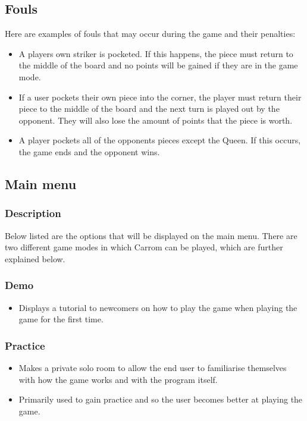 \documentclass[11pt,a4paper]{report}
\begin{document}
\subsection{Fouls}
Here are examples of fouls that may occur during the game and their penalties:
\begin{itemize}
  \item A players own striker is pocketed. If this happens, the piece must return to the middle of the board and no points will be gained if they are in the game mode.
  \item If a user pockets their own piece into the corner, the player must return their piece to the middle of the board and the next turn is played out by the opponent. They will also lose the amount of points that the piece is worth.
  \item A player pockets all of the opponents pieces except the Queen. If this occurs, the game ends and the opponent wins.
\end{itemize}

\subsection{Main menu}
\subsubsection{Description}
\noindent Below listed are the options that will be displayed on the main menu. There are two different game modes in which Carrom can be played, which are further explained below.

\subsubsection{Demo}
\begin{itemize}
    \item Displays a tutorial to newcomers on how to play the game when playing the game for the first time.
\end{itemize}

\subsubsection{Practice}
\begin{itemize}
    \item Makes a private solo room to allow the end user to familiarise themselves with how the game works and with the program itself.
    \item Primarily used to gain practice and so the user becomes better at playing the game.
\end{itemize}
\end{document}
